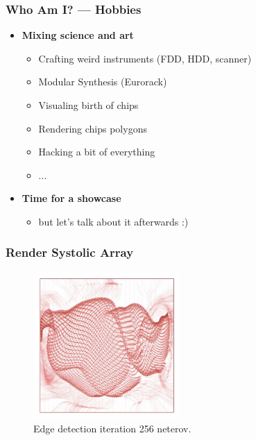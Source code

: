 \begin{frame}
	\frametitle{Who Am I? — Hobbies}
	\begin{itemize}
		\item<1-> \textbf{Mixing science and art}
		\begin{itemize}
			\item Crafting weird instruments (FDD, HDD, scanner)
			\item Modular Synthesis (Eurorack)
			\item Visualing birth of chips
			\item Rendering chips polygons
			\item Hacking a bit of everything
			\item ...
		\end{itemize}
		\item<2-> \textbf{Time for a showcase}
		\begin{itemize}
			\item but let's talk about it afterwards :)
		\end{itemize}
	\end{itemize}
\end{frame}

\begin{frame}
	\frametitle{Render Systolic Array}
	\begin{figure}[H]
		\centering
		\includegraphics[width=0.5\textwidth]{4096PE.jpg}
		\caption{Edge detection iteration 256 neterov.}
		\label{fig:4096PE}
	\end{figure}
\end{frame}

